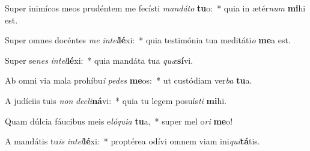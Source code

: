 \item Super inimícos meos prudéntem me fecísti \textit{man}\textit{dá}\textit{to} \textbf{tu}o:~* quia in ætér\textit{num} \textbf{mi}hi est.
\item Super omnes docéntes \textit{me} \textit{in}\textit{tel}\textbf{lé}xi:~* quia testimónia tua meditáti\textit{o} \textbf{me}a est.
\item Super se\textit{nes} \textit{in}\textit{tel}\textbf{lé}xi:~* quia mandáta tua \textit{quæ}\textbf{sí}vi.
\item Ab omni via mala prohíbu\textit{i} \textit{pe}\textit{des} \textbf{me}os:~* ut custódiam ver\textit{ba} \textbf{tu}a.
\item A judíciis tuis \textit{non} \textit{de}\textit{cli}\textbf{ná}vi:~* quia tu legem posuís\textit{ti} \textbf{mi}hi.
\item Quam dúlcia fáucibus meis e\textit{ló}\textit{qui}\textit{a} \textbf{tu}a,~* super mel o\textit{ri} \textbf{me}o!
\item A mandátis tu\textit{is} \textit{in}\textit{tel}\textbf{lé}xi:~* proptérea odívi omnem viam ini\textit{qui}\textbf{tá}tis.
